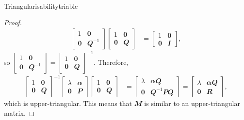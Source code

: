 \documentclass[math]{amznotes}
\theoremstyle{remark}
\newcommand{\zero}{\mathbf{0}}
\begin{document}
\begin{thmbox}{Triangularisability}{triable}
\begin{proof}
        \begin{align*}
            \begin{bmatrix}
                1 & \zero \\
                \zero & \mathbfit{Q}^{-1}
            \end{bmatrix}\begin{bmatrix}
                1 & \zero \\
                \zero & \mathbfit{Q}
            \end{bmatrix} & = \begin{bmatrix}
                1 & \zero \\
                \zero & \mathbfit{I}
            \end{bmatrix},
        \end{align*}
        so $\left[\begin{smallmatrix}
            1 & \zero \\
                \zero & \mathbfit{Q}^{-1}
        \end{smallmatrix}\right] = \left[\begin{smallmatrix}
            1 & \zero \\
                \zero & \mathbfit{Q}
        \end{smallmatrix}\right]^{-1}$. Therefore,
        \begin{align*}
            \begin{bmatrix}
                1 & \zero \\
                \zero & \mathbfit{Q}
            \end{bmatrix}^{-1}\begin{bmatrix}
                \lambda & \mathbfit{\alpha} \\
                \zero & \mathbfit{P}
            \end{bmatrix}\begin{bmatrix}
                1 & \zero \\
                \zero & \mathbfit{Q}
            \end{bmatrix} & = \begin{bmatrix}
                \lambda & \mathbfit{\alpha}\mathbfit{Q}\\
                \zero & \mathbfit{Q}^{-1}\mathbfit{PQ}
            \end{bmatrix} = \begin{bmatrix}
                \lambda & \mathbfit{\alpha}\mathbfit{Q}\\
                \zero & \mathbfit{R}
            \end{bmatrix},
        \end{align*}
        which is upper-triangular. This means that $\mathbfit{M}$ is similar to an upper-triangular matrix.
    \end{proof}
\end{thmbox}
\end{document}
